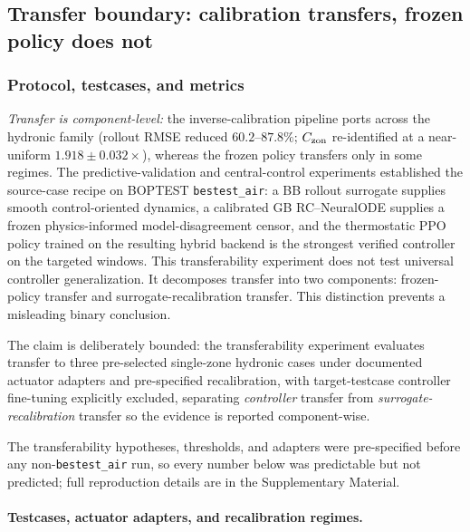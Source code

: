 \subsection{Transfer boundary: calibration transfers, frozen policy does not}
\label{sec:results3-transfer}

\subsubsection{Protocol, testcases, and metrics}

\emph{Transfer is component-level:} the inverse-calibration pipeline ports across the hydronic family (rollout RMSE reduced $60.2$--$87.8\%$; $C_{\mathrm{zon}}$ re-identified at a near-uniform $1.918\pm0.032\times$), whereas the frozen policy transfers only in some regimes. The predictive-validation and central-control experiments established the source-case recipe on BOPTEST \texttt{bestest\_air}: a BB rollout surrogate supplies smooth control-oriented dynamics, a calibrated GB RC--NeuralODE supplies a frozen physics-informed model-disagreement censor, and the thermostatic PPO policy trained on the resulting hybrid backend is the strongest verified controller on the targeted windows. This transferability experiment does not test universal controller generalization. It decomposes transfer into two components: frozen-policy transfer and surrogate-recalibration transfer. This distinction prevents a misleading binary conclusion.

The claim is deliberately bounded: the transferability experiment evaluates transfer to three pre-selected single-zone hydronic cases under documented actuator adapters and pre-specified recalibration, with target-testcase controller fine-tuning explicitly excluded, separating \emph{controller} transfer from \emph{surrogate-recalibration} transfer so the evidence is reported component-wise.








The transferability hypotheses, thresholds, and adapters were pre-specified before any non-\texttt{bestest\_air} run, so every number below was predictable but not predicted; full reproduction details are in the Supplementary Material.

\paragraph{Testcases, actuator adapters, and recalibration regimes.}

